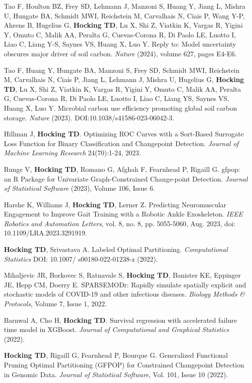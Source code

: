 \documentclass[margin,line]{res}
\begin{document}
\begin{resume}
Tao F, Houlton BZ, Frey SD, Lehmann J, Manzoni S, Huang Y, Jiang L,
Mishra U, Hungate BA, Schmidt MWI, Reichstein M, Carvalhais N, Ciais
P, Wang Y-P, Ahrens B, Hugelius G, {\bf Hocking TD}, Lu X, Shi Z, Viatkin K,
Vargas R, Yigini Y, Omuto C, Malik AA, Peralta G, Cuevas-Corona R, Di
Paolo LE, Luotto I, Liao C, Liang Y-S, Saynes VS, Huang X, Luo
Y. Reply to: Model uncertainty obscures major driver of soil
carbon. {\it Nature} (2024), volume 627, pages E4-E6.

Tao F, Huang Y, Hungate BA, Manzoni S, Frey SD, Schmidt MWI,
Reichstein M, Carvalhais N, Ciais P, Jiang L, Lehmann J, Mishra U,
Hugelius G, {\bf Hocking TD}, Lu X, Shi Z, Viatkin K, Vargas R, Yigini
Y, Omuto C, Malik AA, Peralta G, Cuevas-Corona R, Di Paolo LE, Luotto
I, Liao C, Liang YS, Saynes VS, Huang X, Luo Y. Microbial carbon use
efficiency promoting global soil carbon storage. {\it Nature} (2023).
DOI:10.1038/s41586-023-06042-3.

Hillman J, {\bf Hocking TD}. Optimizing ROC Curves with a Sort-Based
Surrogate Loss Function for Binary Classification and Changepoint
Detection. {\it Journal of Machine Learning Research} 24(70):1-24, 2023.

Runge V, {\bf Hocking TD}, Romano G, Afghah F, Fearnhead P, Rigaill
G. gfpop: an R Package for Univariate Graph-Constrained Change-point
Detection. {\it Journal of Statistical Software} (2023), Volume 106,
Issue 6.

Harshe K, Williams J, {\bf Hocking TD}, Lerner Z. Predicting Neuromuscular
Engagement to Improve Gait Training with a Robotic Ankle
Exoskeleton. {\it IEEE Robotics and Automation Letters}, vol. 8,
no. 8, pp. 5055-5060, Aug. 2023, doi: 10.1109/LRA.2023.3291919.

{\bf Hocking TD}, Srivastava A. Labeled Optimal Partitioning. {\it
  Computational Statistics} DOI: 10.1007/ s00180-022-01238-z (2022).

Mihaljevic JR, Borkovec S, Ratnavale S, \textbf{Hocking TD}, Banister
KE, Eppinger JE, Hepp CM, Doerry E. SPARSEMODr: Rapidly simulate
spatially explicit and stochastic models of COVID-19 and other
infectious diseases. {\it Biology Methods \& Protocols}, Volume 7,
Issue 1, 2022.

Barnwal A, Cho H, {\bf Hocking TD}. Survival regression with
accelerated failure time model in XGBoost. {\it Journal of
  Computational and Graphical Statistics} (2022).

{\bf Hocking TD}, Rigaill G, Fearnhead P, Bourque G. Generalized
Functional Pruning Optimal Partitioning (GFPOP) for Constrained
Changepoint Detection in Genomic Data. {\it Journal of Statistical
  Software}, Vol. 101, Issue 10 (2022).


\end{resume}
\end{document}
